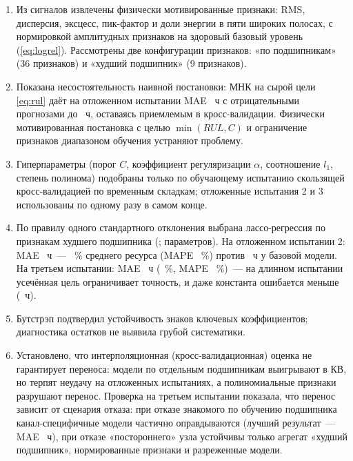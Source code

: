 \documentclass[14pt,a4paper]{extarticle}
\begin{document}
\begin{enumerate}
  \item Из сигналов извлечены физически мотивированные признаки: RMS,
  дисперсия, эксцесс, пик-фактор и доли энергии в пяти широких полосах,
  с нормировкой амплитудных признаков на здоровый базовый уровень
  (\ref{eq:logrel}). Рассмотрены две конфигурации признаков: «по
  подшипникам» (36 признаков) и «худший подшипник» (9 признаков).
  \item Показана несостоятельность наивной постановки: МНК на сырой цели
  \eqref{eq:rul} даёт на отложенном испытании MAE \OlsMAETest~ч с
  отрицательными прогнозами до \OlsMinPred~ч, оставаясь приемлемым
  в кросс-валидации. Физически мотивированная постановка с целью
  $\min(RUL, C)$ и ограничение признаков диапазоном обучения устраняют
  проблему.
  \item Гиперпараметры (порог $C$, коэффициент регуляризации $\alpha$,
  соотношение $l_1$, степень полинома) подобраны только по обучающему
  испытанию скользящей кросс-валидацией по временным складкам; отложенные
  испытания 2 и 3 использованы по одному разу в самом конце.
  \item По правилу одного стандартного отклонения выбрана лассо-регрессия
  по признакам худшего подшипника (\BestHyper; \BestDof{} параметров).
  На отложенном испытании 2: MAE \BestMAETest~ч~--- \BestNMAETest~\%
  среднего ресурса (MAPE \BestMAPETest~\%) против \BaseMAETest~ч
  у базовой модели. На третьем испытании: MAE \BestMAETestThree~ч
  (\BestNMAETestThree~\%, MAPE \BestMAPETestThree~\%)~--- на длинном
  испытании усечённая цель ограничивает точность, и даже константа
  ошибается меньше (\BaseMAETestThree~ч).
  \item Бутстрэп подтвердил устойчивость знаков ключевых коэффициентов;
  диагностика остатков не выявила грубой систематики.
  \item Установлено, что интерполяционная (кросс-валидационная) оценка
  не гарантирует переноса: модели по отдельным подшипникам выигрывают
  в КВ, но терпят неудачу на отложенных испытаниях, а полиномиальные
  признаки разрушают перенос. Проверка на третьем испытании показала,
  что перенос зависит от сценария отказа: при отказе знакомого
  по обучению подшипника канал-специфичные модели частично оправдываются
  (лучший результат~--- MAE \LassoAMAETestThree~ч), при отказе
  «постороннего» узла устойчивы только агрегат «худший подшипник»,
  нормированные признаки и разреженные модели.
\end{enumerate}
\end{document}
